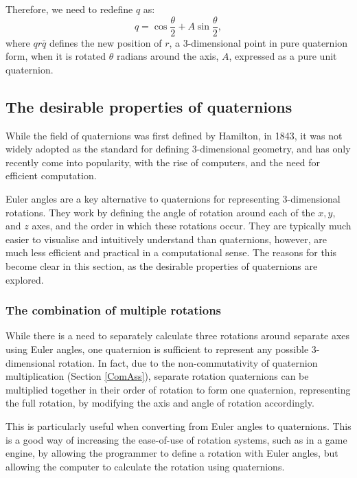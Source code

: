 \documentclass[10pt]{article}
\begin{document}
Therefore, we need to redefine $q$ as:
\begin{equation}
    q = \cos\frac{\theta}{2} + A\sin\frac{\theta}{2},
\end{equation}
where $qr\bar{q}$ defines the new position of $r$, a 3-dimensional point in pure quaternion form, when it is rotated $\theta$ radians around the axis, $A$, expressed as a pure unit quaternion.

\subsection{The desirable properties of quaternions}

While the field of quaternions was first defined by Hamilton, in 1843, it was not widely adopted as the standard for defining 3-dimensional geometry, and has only recently come into popularity, with the rise of computers, and the need for efficient computation. \cite{3Blue1Brown}

Euler angles are a key alternative to quaternions for representing 3-dimensional rotations. They work by defining the angle of rotation around each of the $x, y$, and $z$ axes, and the order in which these rotations occur. They are typically much easier to visualise and intuitively understand than quaternions, however, are much less efficient and practical in a computational sense. The reasons for this become clear in this section, as the desirable properties of quaternions are explored.

\subsubsection{The combination of multiple rotations} \label{RotComb}

While there is a need to separately calculate three rotations around separate axes using Euler angles, one quaternion is sufficient to represent any possible 3-dimensional rotation. In fact, due to the non-commutativity of quaternion multiplication (Section \ref{ComAss}), separate rotation quaternions can be multiplied together in their order of rotation to form one quaternion, representing the full rotation, by modifying the axis and angle of rotation accordingly.

This is particularly useful when converting from Euler angles to quaternions. This is a good way of increasing the ease-of-use of rotation systems, such as in a game engine, by allowing the programmer to define a rotation with Euler angles, but allowing the computer to calculate the rotation using quaternions.
\end{document}
